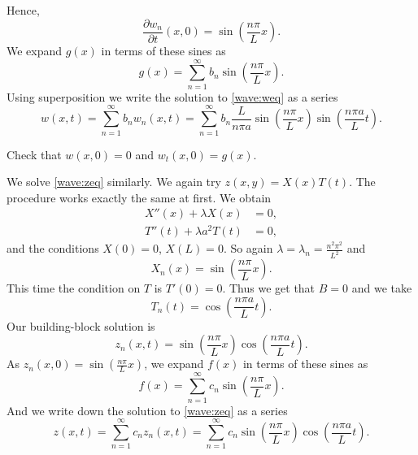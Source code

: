Hence,
\begin{equation*}
\frac{\partial w_n}{\partial t}(x,0) =
\sin \left( \frac{n \pi}{L} x \right) .
\end{equation*}
We expand $g(x)$ in terms of these sines as
\begin{equation*}
g(x) =
\sum_{n=1}^\infty b_n \sin \left( \frac{n \pi}{L} x \right) .
\end{equation*}
Using superposition
we write the solution to \eqref{wave:weq} as a series
\begin{equation*}
w(x,t) =
\sum_{n=1}^\infty
b_n
w_n(x,t)
=
\sum_{n=1}^\infty
b_n
\frac{L}{n \pi a}
\sin \left( \frac{n \pi}{L} x \right)
\sin \left( \frac{n \pi a}{L} t \right) .
\end{equation*}

\begin{exercise}
Check that $w(x,0) = 0$ and
$w_t(x,0) = g(x)$.
\end{exercise}

We solve \eqref{wave:zeq} similarly.  We again try
$z(x,y) = X(x)T(t)$.  The procedure works exactly the same at first.
We obtain
\begin{align*}
X''(x) + \lambda X(x) &= 0 , \\
T''(t) + \lambda a^2 T(t) &= 0 ,
\end{align*}
and the conditions $X(0) = 0$, $X(L) = 0$.  So again
$\lambda = \lambda_n = \frac{n^2 \pi^2}{L^2}$ and
\begin{equation*}
X_n(x) = \sin \left( \frac{n \pi}{L} x \right) .
\end{equation*}
This time
the condition on $T$ is $T'(0) = 0$.  Thus 
we get that $B = 0$ and we take
\begin{equation*}
T_n(t) = \cos \left( \frac{n \pi a}{L} t \right).
\end{equation*}
Our building-block solution is
\begin{equation*}
z_n(x,t) = 
\sin \left( \frac{n \pi}{L} x \right)
\cos \left( \frac{n \pi a}{L} t \right) .
\end{equation*}
As $z_n(x,0) = \sin \left( \frac{n \pi}{L} x \right)$,
we expand $f(x)$ in terms of these sines as
\begin{equation*}
f(x) =
\sum_{n=1}^\infty c_n \sin \left( \frac{n \pi}{L} x \right) .
\end{equation*}
And we
write down the solution to \eqref{wave:zeq} as a series
\begin{equation*}
z(x,t) =
\sum_{n=1}^\infty
c_n
z_n(x,t)
=
\sum_{n=1}^\infty
c_n
\sin \left( \frac{n \pi}{L} x \right)
\cos \left( \frac{n \pi a}{L} t \right) .
\end{equation*}

